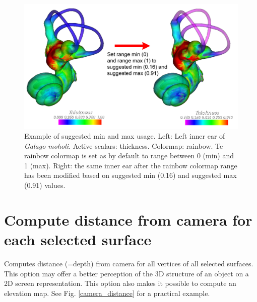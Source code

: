 \begin{figure}
  \centering
  \includegraphics[scale=0.38]{images/11/accept_suggested_min_max.png} 
	\caption{
Example of suggested min and max usage. Left: Left inner ear of \textit{Galago moholi}. Active scalars: thickness. Colormap: rainbow. Te rainbow colormap is set as by default to range between 0 (min) and 1 (max). Right: the same inner ear after the rainbow colormap range has been modified based on suggested min (0.16) and suggested max (0.91) values.}
\label{accept_suggested_min_max}
 
\end{figure}
\noindent




\section{Compute distance from camera for each selected surface}
\noindent
Computes distance (=depth) from camera for all vertices of all selected surfaces. This option may offer a better
perception of the 3D structure of an object on a 2D screen representation. This option also makes it possible to compute an elevation map. See Fig. \ref{camera_distance} for a practical example. 
 
